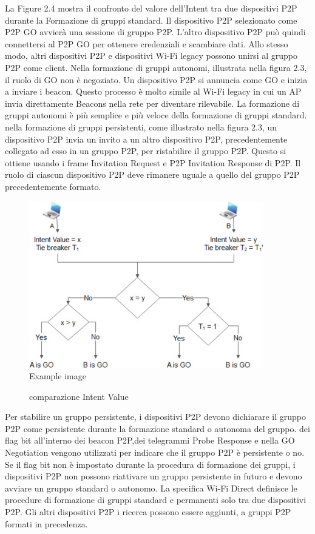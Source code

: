 La Figure 2.4 mostra il confronto del valore
dell'Intent tra due dispositivi P2P durante la Formazione di gruppi 
standard. Il dispositivo P2P selezionato come P2P GO avvierà una
sessione di gruppo P2P. L'altro dispositivo P2P può quindi
connettersi al P2P GO per ottenere credenziali e scambiare
dati. Allo stesso modo, altri dispositivi P2P e dispositivi
Wi-Fi legacy possono unirsi al gruppo P2P come client. Nella
formazione di gruppi autonomi, illustrata nella figura 2.3,
il ruolo di GO non è negoziato. Un dispositivo P2P 
si annuncia come GO e inizia a inviare i beacon. Questo
processo è molto simile al Wi-Fi legacy in cui un AP 
invia direttamente Beacons nella rete per diventare
rilevabile. La formazione di gruppi autonomi è più
semplice e più veloce della formazione di gruppi
standard. nella formazione di gruppi persistenti, come illustrato 
nella figura 2.3, un dispositivo P2P invia un invito
a un altro dispositivo P2P, precedentemente collegato
ad esso in un gruppo P2P, per ristabilire il gruppo P2P. 
Questo si ottiene usando i frame Invitation Request e P2P
Invitation Response di P2P. Il ruolo di ciascun dispositivo
P2P deve rimanere uguale a quello del gruppo P2P precedentemente
formato. 
\begin{figure}
\centering
\caption{comparazione Intent Value}
\includegraphics[width=0.6\columnwidth]{imgs/intentValueComparison.jpg} %
Example image

\end{figure}
Per stabilire un gruppo persistente, i dispositivi P2P
devono dichiarare il gruppo P2P come persistente durante la formazione
standard o autonoma del gruppo.
dei flag bit all'interno dei beacon P2P,dei telegrammi Probe 
Response e nella GO Negotiation vengono utilizzati 
per indicare che il gruppo P2P è persistente o no. 
Se il flag bit non è impostato durante la procedura di formazione dei
gruppi, i dispositivi P2P non possono riattivare un gruppo persistente
in futuro e devono avviare un gruppo standard o autonomo. La specifica
Wi-Fi Direct \cite{alliance2016wi} definisce le procedure di formazione di
gruppi standard
e permanenti solo tra due dispositivi P2P. Gli altri dispositivi P2P i ricerca
possono essere aggiunti, a gruppi P2P formati in precedenza.



